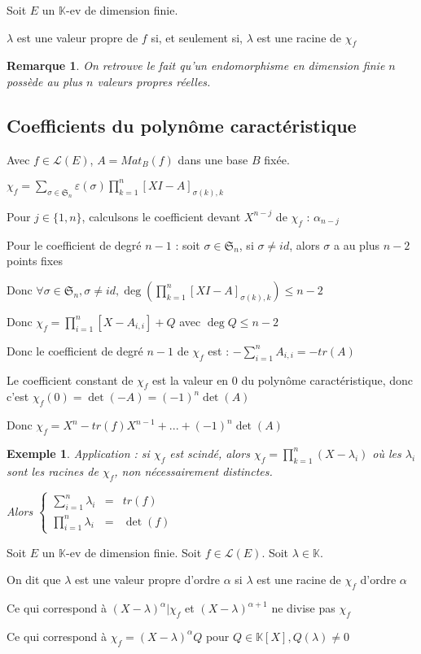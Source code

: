 \documentclass[a4paper,12pt]{book}
\newcommand{\Def}[2]{\begin{tcolorbox}[sharp corners, colback=white,colframe=blue!90!black!75, title=Définition : #1]#2\end{tcolorbox}}
\newcommand{\Prop}[2]{\begin{tcolorbox}[sharp corners, colback=white,colframe=red!90!black!75, title=Proposition : #1]#2\end{tcolorbox}}
\newtheorem{Exe}{Exemple}[section]
\newtheorem{Rem}{Remarque}[section]
\def\K{\mathbb{K}}
\begin{document}
\Prop{Valeurs propres}{Soit $E$ un $\K$-ev de dimension finie. \par $\lambda$ est une valeur propre de $f$ si, et seulement si, $\lambda$ est une racine de $\chi_f$}
\begin{Rem}
On retrouve le fait qu'un endomorphisme en dimension finie $n$ possède au plus $n$ valeurs propres réelles.
\end{Rem}
\subsection{Coefficients du polynôme caractéristique}
Avec $f\in\mathcal{L}(E)$, $A=Mat_B(f)$ dans une base $B$ fixée. \par $\chi_f=\sum\limits_{\sigma\in\mathfrak{S}_n}\varepsilon(\sigma)\prod\limits_{k=1}^n[XI-A]_{\sigma(k),k}$ \par Pour $j\in\{1,n\}$, calculsons le coefficient devant $X^{n-j}$ de $\chi_f$ : $\alpha_{n-j}$ \par Pour le coefficient de degré $n-1$ : soit $\sigma\in\mathfrak{S}_n$, si $\sigma\neq id$, alors $\sigma$ a au plus $n-2$ points fixes \par Donc $\forall\sigma\in\mathfrak{S}_n,\sigma\neq id, \deg(\prod\limits_{k=1}^n[XI-A]_{\sigma(k),k})\leq n-2$ \par Donc $\chi_f = \prod\limits_{i=1}^n[X-A_{i,i}] + Q$ avec $\deg Q\leq n-2$ \par Donc le coefficient de degré $n-1$ de $\chi_f$ est : $-\sum\limits_{i=1}^nA_{i,i}=-tr(A)$
\par Le coefficient constant de $\chi_f$ est la valeur en $0$ du polynôme caractéristique, donc c'est $\chi_f(0)=\det(-A)=(-1)^n\det(A)$ \par Donc $\chi_f = X^n-tr(f)X^{n-1} +...+(-1)^n\det(A)$
\begin{Exe}
Application : si $\chi_f$ est scindé, alors $\chi_f=\prod\limits_{k=1}^n(X-\lambda_i)$ où les $\lambda_i$ sont les racines de $\chi_f$, non nécessairement distinctes. \par Alors $\left\{\begin{array}{ccl}\sum\limits_{i=1}^n\lambda_i & = & tr(f) \\ \prod\limits_{i=1}^n\lambda_i & = & \det (f) \end{array}\right.$
\end{Exe}
\Def{Ordre d'une valeur propre}{Soit $E$ un $\K$-ev de dimension finie. Soit $f\in\mathcal{L}(E)$. Soit $\lambda \in\K$. \par On dit que $\lambda$ est une valeur propre d'ordre $\alpha$ si $\lambda$ est une racine de $\chi_f$ d'ordre $\alpha$
\par Ce qui correspond à $(X-\lambda)^\alpha|\chi_f$ et $(X-\lambda)^{\alpha+1}$ ne divise pas $\chi_f$ \par Ce qui correspond à $\chi_f = (X-\lambda)^\alpha Q$ pour $Q\in\K[X], Q(\lambda)\neq 0$}
\end{document}
